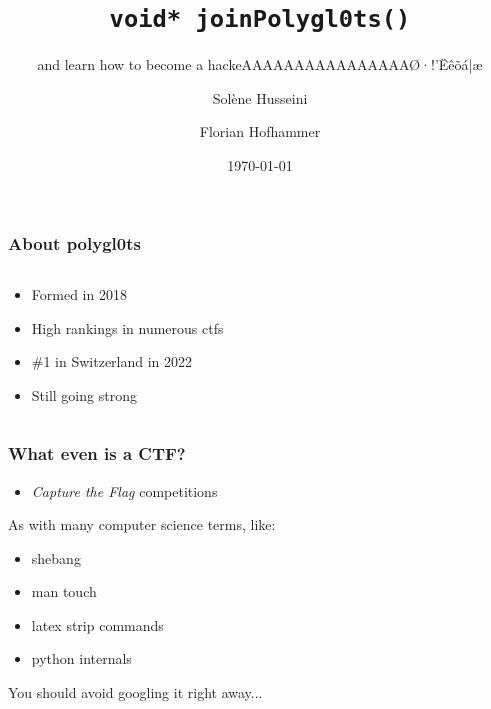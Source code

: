 \documentclass[aspectratio=169]{beamer}
\title{\texttt{void* joinPolygl0ts()}}
\subtitle{and learn how to become a hackeAAAAAAAAAAAAAAAAØ·!'Ëêõá|æ}
\author{Sol\`ene Husseini \and Florian Hofhammer}
\date{\today}
\begin{document}
\titleframe

\begin{frame}
    \frametitle{About polygl0ts}
    \begin{columns}
        \begin{column}{0.5\textwidth}
            \begin{itemize}
                \item Formed in 2018
				\item High rankings in numerous ctfs
				\item \#1 in Switzerland in 2022
				\item Still going strong
            \end{itemize}
        \end{column}
        \begin{column}{0.5\textwidth}
            
        \end{column}
    \end{columns}
\end{frame}

\begin{frame}
	\frametitle{What even is a CTF?}
	\begin{itemize}
		\item \textit{Capture the Flag} competitions
	\end{itemize}
	\pause
	\vspace{2em}
	As with many computer science terms, like:
	\begin{itemize}
		\item shebang
		\item man touch
		\item latex strip commands
		\item python internals
	\end{itemize}
	You should avoid googling it right away...
\end{frame}
\end{document}
